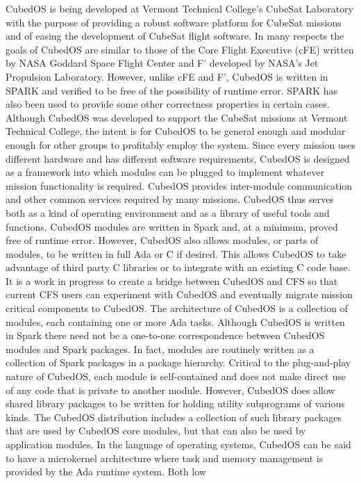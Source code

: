 CubedOS is being developed at Vermont Technical College’s CubeSat
Laboratory with the purpose of providing a robust software platform
for CubeSat missions and of easing the development of CubeSat flight
software. In many respects the goals of CubedOS are similar to those
of the Core Flight Executive (cFE) written by NASA Goddard Space
Flight Center and F’ developed by NASA’s Jet
Propulsion Laboratory. However, unlike cFE and F’,
CubedOS is written in SPARK and verified to be free of the possibility
of runtime error. SPARK has also been used to provide some other
correctness properties in certain cases.  Although CubedOS was
developed to support the CubeSat missions at Vermont Technical
College, the intent is for CubedOS to be general enough and modular
enough for other groups to profitably employ the system. Since every
mission uses different hardware and has different software
requirements, CubedOS is designed as a framework into which modules
can be plugged to implement whatever mission functionality is
required. CubedOS provides inter-module communication and other common
services required by many missions. CubedOS thus serves both as a kind
of operating environment and as a library of useful tools and
functions. CubedOS modules are written in Spark and, at a minimum,
proved free of runtime error. However, CubedOS also allows modules, or
parts of modules, to be written in full Ada or C if desired. This
allows CubedOS to take advantage of third party C libraries or to
integrate with an existing C code base. It is a work in progress to
create a bridge between CubedOS and CFS so that current CFS users can
experiment with CubedOS and eventually migrate mission critical
components to CubedOS. The architecture of CubedOS is a collection of
modules, each containing one or more Ada tasks. Although CubedOS is
written in Spark there need not be a one-to-one correspondence between
CubedOS modules and Spark packages. In fact, modules are routinely
written as a collection of Spark packages in a package hierarchy.
Critical to the plug-and-play nature of CubedOS, each module is
self-contained and does not make direct use of any code that is
private to another module. However, CubedOS does allow shared library
packages to be written for holding utility subprograms of various
kinds. The CubedOS distribution includes a collection of such library
packages that are used by CubedOS core modules, but that can also be
used by application modules. In the language of operating systems,
CubedOS can be said to have a microkernel architecture where task and
memory management is provided by the Ada runtime system. Both low
